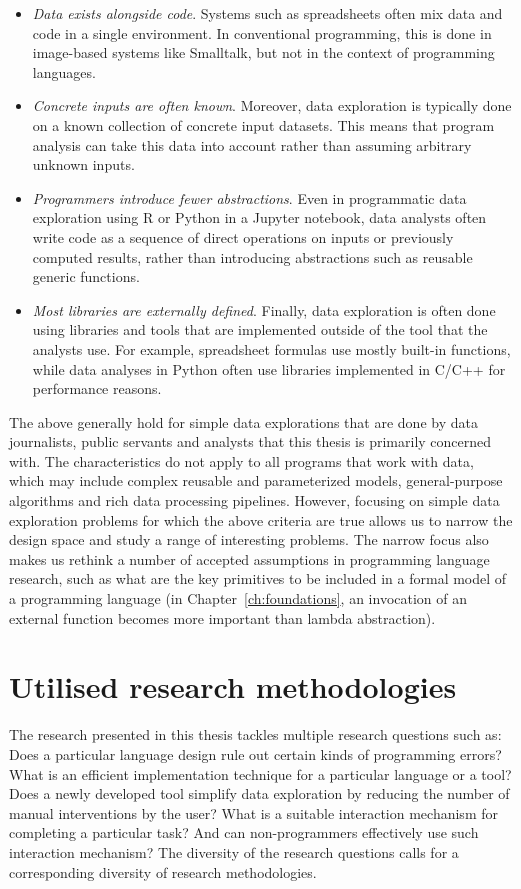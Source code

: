 \documentclass[fleqn,11pt]{report}
\theoremstyle{definition}
\newenvironment{nitemize}
{ \vspace{-0.4em}
  \begin{itemize}
    \setlength{\itemsep}{5pt}
    \setlength{\parskip}{0pt}
    \setlength{\parsep}{0pt} }
{ \end{itemize}
  \vspace{-0.4em} }
\begin{document}
\begin{nitemize}
\item \emph{Data exists alongside code}. Systems such as spreadsheets often mix
  data and code in a single environment. In conventional programming, this is done in
  image-based systems like Smalltalk, but not in the context of programming languages.

\item \emph{Concrete inputs are often known}. Moreover, data exploration is typically done on a
  known collection of concrete input datasets. This means that program analysis can take
  this data into account rather than assuming arbitrary unknown inputs.

\item \emph{Programmers introduce fewer abstractions}. Even in programmatic data exploration using
  R or Python in a Jupyter notebook, data analysts often write code as a sequence of
  direct operations on inputs or previously computed results, rather than introducing abstractions
  such as reusable generic functions.

\item \emph{Most libraries are externally defined}. Finally, data exploration is
  often done using libraries and tools that are implemented outside of the tool that the analysts
  use. For example, spreadsheet formulas use mostly built-in functions, while data analyses in
  Python often use libraries implemented in C/C++ for performance reasons.
\end{nitemize}

The above generally hold for simple data explorations that are done by data journalists, public
servants and analysts that this thesis is primarily concerned with. The characteristics do not
apply to all programs that work with data, which may include complex reusable and parameterized
models, general-purpose algorithms and rich data processing pipelines. However, focusing on simple
data exploration problems for which the above criteria are true allows us to narrow the design
space and study a range of interesting problems. The narrow focus also makes us rethink a number of
accepted assumptions in programming language research, such as what are the key primitives to be
included in a formal model of a programming language (in Chapter~\ref{ch:foundations}, an
invocation of an external function becomes more important than lambda abstraction).

\section{Utilised research methodologies}
The research presented in this thesis tackles multiple research questions such as:
Does a particular language design rule out certain kinds of programming errors? What is an
efficient implementation technique for a particular language or a tool? Does a newly
developed tool simplify data exploration by reducing the number of manual interventions
by the user? What is a suitable interaction mechanism for completing a particular task?
And can non-programmers effectively use such interaction mechanism?
The diversity of the research questions calls for a corresponding diversity of research
methodologies.
\end{document}
